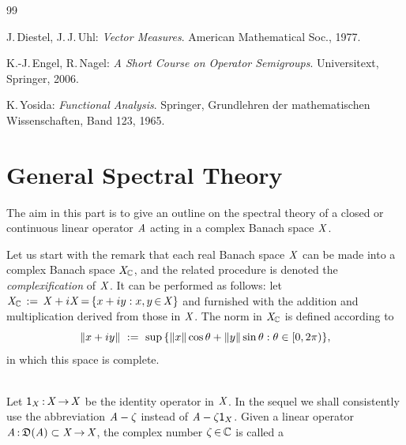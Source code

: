 \documentclass[11pt,twoside]{article}
\begin{document}
\vspace{5mm}
\begin{thebibliography}{99}
\begin{small}

 J.\,Diestel, J.\,J.\,Uhl:
\textit{Vector Measures}.
American Mathematical Soc., 1977.

 K.-J.\,Engel, R.\,Nagel:
\textit{A Short Course on Operator Semigroups}.
Universitext, Springer, 2006.

 K.\,Yosida:
\textit{Functional Analysis}.
Springer, Grund\-lehren der mathematischen Wissenschaften, Band 123, 1965.

\end{small}
\end{thebibliography}

\newpage
\thispagestyle{empty}
\part{General Spectral Theory}                                                 %
The aim in this part
is to give an outline on the spectral theory of a closed or continuous
linear operator $\mathit{A}$ acting in a complex Banach space $\mathit{X}$.

\subparagraph{}
Let us start with the remark
that each real Banach space $\mathit{X}$ can be made
into a complex Banach space $\mathit{X}_{{\mathbb{C}}}$,
and the related procedure is denoted the \textit{complexification} of $\mathit{X}$.
It can be performed as follows:
let $\mathit{X}_{{\mathbb{C}}} \,:=\, \mathit{X} + i \mathit{X} {\,=\,} \{x+iy: x,y {\,\in\,} \mathit{X}\}$
and furnished with the addition and multiplication
derived from those in $\mathit{X}$.
The norm in $\mathit{X}_{{\mathbb{C}}}$ is defined according to
\[
\left\lVert x+iy \right\rVert \, \,:=\, \,
\sup \, \{\left\lVert x \right\rVert \cos \theta + \left\lVert y \right\rVert \sin \theta: \theta \in [0,2\pi)\},
\]
in which this space is complete.

\paragraph{}
Let ${\mathsf{1}}_X {\,:\,} \mathit{X} {\,\to\,} \mathit{X}$ be the identity operator in $\mathit{X}$.
In the sequel we shall consistently use the abbreviation $\mathit{A} - \zeta$
instead of $\mathit{A} -\zeta {\mathsf{1}}_X$.
Given a linear operator
$\mathit{A} {\,:\,} \mathfrak{D}(\mathit{A}) \subset \mathit{X} {\,\to\,} \mathit{X}$,
the complex number $\zeta {\,\in\,} {\mathbb{C}}$ is called a
\end{document}
